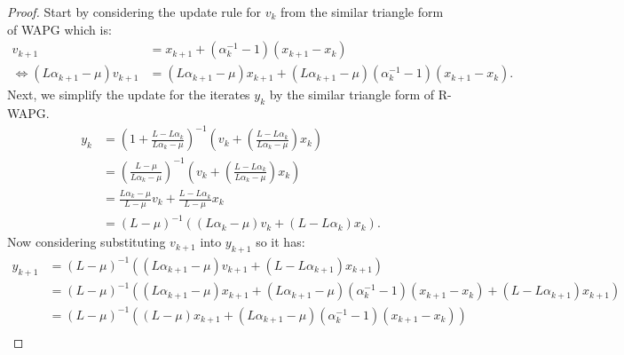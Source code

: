 \documentclass[12pt]{article}
\begin{document}
    \begin{proof}
                
        Start by considering the update rule for $v_k$ from the similar triangle form of WAPG which is: 
        \begin{align*}
            v_{k + 1} &= 
            x_{k + 1} + (\alpha_k^{-1} - 1)(x_{k + 1} - x_k)
            \\
            \iff 
            (L \alpha_{k + 1} - \mu)v_{k + 1} 
            &= 
            (L \alpha_{k + 1} - \mu)x_{k + 1} + (L\alpha_{k + 1} - \mu)(\alpha_k^{-1} - 1)(x_{k + 1} - x_k). 
        \end{align*}
        Next, we simplify the update for the iterates $y_{k}$ by the similar triangle form of R-WAPG. 
        \begin{align*}
            y_k &= 
            \left(
                1 + \frac{L - L\alpha_k}{L\alpha_k - \mu}
            \right)^{-1}
            \left(
                v_k + 
                \left(\frac{L - L\alpha_k}{L\alpha_k - \mu} \right) x_k
            \right)
            \\
            &= 
            \left(
            \frac{L - \mu}{L\alpha_k - \mu} 
            \right)^{-1}
            \left(
                v_k + 
                \left(\frac{L - L\alpha_k}{L\alpha_k - \mu} \right) x_k
            \right)
            \\
            &= 
            \frac{L\alpha_k - \mu}{L - \mu} v_k
            + 
            \frac{L - L \alpha_k}{L - \mu} x_k
            \\
            &= (L - \mu)^{-1}((L \alpha_k - \mu)v_k + (L - L \alpha_k)x_k). 
        \end{align*}
        Now considering substituting $v_{k + 1}$ into $y_{k + 1}$ so it has: 
        {\small
        \begin{align*}
            y_{k + 1} &= 
            (L - \mu)^{-1}((L\alpha_{k + 1} - \mu)v_{k + 1} + (L - L \alpha_{k + 1})x_{k + 1})
            \\
            &= (L - \mu)^{-1}
            \left(
                (L\alpha_{k + 1} - \mu)x_{k + 1} + 
                (L\alpha_{k + 1} - \mu)(\alpha_k^{-1} - 1)(x_{k + 1} - x_k)
                + (L - L \alpha_{k + 1})x_{k + 1}
            \right)
            \\
            &= 
            (L - \mu)^{-1}
            \left(
                (L - \mu)x_{k + 1} + (L\alpha_{k + 1} - \mu)(\alpha_k^{-1} - 1)(x_{k + 1} - x_k)
            \right)
            \\

\end{align*}}
\end{proof}
\end{document}
